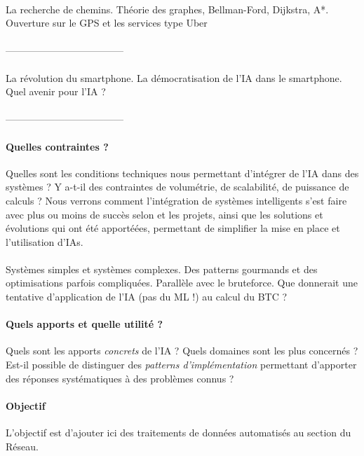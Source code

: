 \paragraph{} La recherche de chemins. Théorie des graphes, Bellman-Ford, Dijkstra, A*.
Ouverture sur le GPS et les services type Uber

\paragraph{} ------------------------------------

\paragraph{} La révolution du smartphone. La démocratisation de l'IA dans le smartphone.
Quel avenir pour l'IA ?

\paragraph{} ------------------------------------

\paragraph{Quelles contraintes ?} Quelles sont les conditions techniques nous
permettant d'intégrer de l'IA dans des systèmes ? Y a-t-il des contraintes de
volumétrie, de scalabilité, de puissance de calculs ? Nous verrons comment
l'intégration de systèmes intelligents s'est faire avec plus ou moins de succès
selon et les projets, ainsi que les solutions et évolutions qui ont été apportéées,
permettant de simplifier la mise en place et l'utilisation d'IAs.

\paragraph{} Systèmes simples et systèmes complexes. Des patterns gourmands et
des optimisations parfois compliquées. Parallèle avec le bruteforce. Que donnerait 
une tentative d'application de l'IA (pas du ML !) au calcul du BTC ?

\paragraph{Quels apports et quelle utilité ?} Quels sont les apports \emph{concrets}
de l'IA ? Quels domaines sont les plus concernés ? Est-il possible de distinguer
des \emph{patterns d'implémentation} permettant d'apporter des réponses systématiques
à des problèmes connus ?

\paragraph{Objectif} L'objectif est d'ajouter ici des traitements de données automatisés au section
du Réseau.

